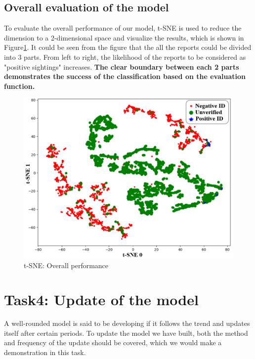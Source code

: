 \documentclass{mcmthesis}
\begin{document}
	\subsection{Overall evaluation of the model}
	\quad To evaluate the overall performance of our model, t-SNE is used to reduce the dimension to a 2-dimensional space and visualize the results, which is shown in Figure\ref{tsne}. It could be seen from the figure that the all the reports could be divided into 3 parts. From left to right, the likelihood of the reports to be considered as "positive sightings" increases. \textbf{The clear boundary between each 2 parts demonstrates the success of the classification based on the evaluation function.}
	\begin{figure}[h]
		\centering
		\includegraphics[scale=0.6]{TSNE.png}
		\caption{t-SNE: Overall performance}
		\label{tsne}
	\end{figure}
\section{Task4: Update of the model}
	\quad A well-rounded model is said to be developing if it follows the trend and updates itself after certain periods. To update the model we have built, both the method and frequency of the update should be covered, which we would make a demonstration in this task.
\end{document}
